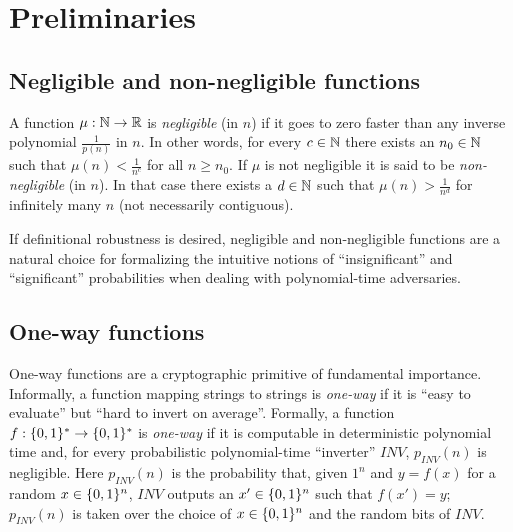 \chapter{Preliminaries}
\label{CH:Preliminaries}

\section{Negligible and non-negligible functions}
\label{SEC:Negligible}
A function $\mu : \mathbb{N} \to \mathbb{R}$ is {\it negligible} (in $n$) if it goes to
zero faster than any inverse polynomial $\frac{1}{p(n)}$ in $n$. In other
words, for every $c \in \mathbb{N}$ there exists an $n_0 \in \mathbb{N}$ such that
$\mu(n) < \frac{1}{n^c}$ for all $n \geq n_0$. If $\mu$ is not negligible it
is said to be {\it non-negligible} (in $n$). In that case there exists a $d
\in \mathbb{N}$ such that $\mu(n) > \frac{1}{n^d}$ for infinitely many $n$ (not
necessarily contiguous). 

If definitional robustness is desired, negligible and non-negligible functions
are a natural choice for formalizing the intuitive notions of
``insignificant'' and ``significant'' probabilities when dealing with
polynomial-time adversaries.

\section{One-way functions}
\label{SEC:Oneway}
One-way functions are a cryptographic primitive of fundamental importance. 
Informally, a function mapping strings to strings is {\it one-way} if it is
``easy to evaluate'' but ``hard to invert on average''. 
Formally, a function $f: \{0,1\}^{*} \to \{0,1\}^{*}$ is {\it one-way} if it is
computable in deterministic polynomial time and, for every probabilistic
polynomial-time ``inverter'' $INV$, $p_{INV}(n)$ is negligible. Here
$p_{INV}(n)$ is the probability that, given $1^n$ and $y = f(x)$ for a random $x
\in \{0,1\}^{n}$, $INV$ outputs an $x' \in \{0,1\}^{n}$ such that $f(x') = y$;
$p_{INV}(n)$ is taken over the choice of $x \in \{0,1\}^{n}$ and the random bits
of $INV$.

